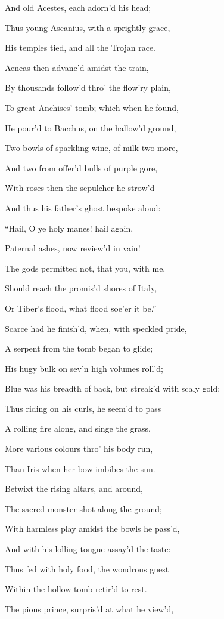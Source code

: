 And old Acestes, each adorn’d his head;

Thus young Ascanius, with a sprightly grace,

His temples tied, and all the Trojan race.

Aeneas then advanc’d amidst the train,

By thousands follow’d thro’ the flow’ry plain,

To great Anchises’ tomb; which when he found,

He pour’d to Bacchus, on the hallow’d ground,

Two bowls of sparkling wine, of milk two more,

And two from offer’d bulls of purple gore,

With roses then the sepulcher he strow’d

And thus his father’s ghost bespoke aloud:

“Hail, O ye holy manes! hail again,

Paternal ashes, now review’d in vain!

The gods permitted not, that you, with me,

Should reach the promis’d shores of Italy,

Or Tiber’s flood, what flood soe’er it be.”

Scarce had he finish’d, when, with speckled pride,

A serpent from the tomb began to glide;

His hugy bulk on sev’n high volumes roll’d;

Blue was his breadth of back, but streak’d with scaly gold:

Thus riding on his curls, he seem’d to pass

A rolling fire along, and singe the grass.

More various colours thro’ his body run,

Than Iris when her bow imbibes the sun.

Betwixt the rising altars, and around,

The sacred monster shot along the ground;

With harmless play amidst the bowls he pass’d,

And with his lolling tongue assay’d the taste:

Thus fed with holy food, the wondrous guest

Within the hollow tomb retir’d to rest.

The pious prince, surpris’d at what he view’d,

